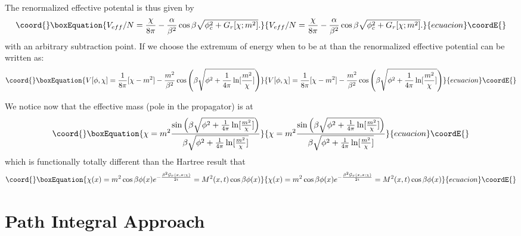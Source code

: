 \documentclass[a4paper,prd,preprint,superscriptaddress,showpacs,byrevtex]{revtex4}
\begin{document}
The renormalized effective potental is thus given by
\begin{equation}\coord{}\boxEquation{
V_{eff}/N  = \frac{\chi}{8 \pi} - \frac {\alpha} {\beta^2} \cos \beta
\sqrt{\phi_c^2 + G_r[\chi;m^2]}.
}{
V_{eff}/N  = \frac{\chi}{8 \pi} - \frac {\alpha} {\beta^2} \cos \beta
\sqrt{\phi_c^2 + G_r[\chi;m^2]}.
}{ecuacion}\coordE{}\end{equation}
with \coordHE{} an arbitrary subtraction point.
If we choose the extremum of energy when \coordHE{} to be at \coordHE{} than
the
renormalized effective potential can be written as:
\begin{equation}\coord{}\boxEquation{
V[\phi,\chi] = \frac{1}{8 \pi} [\chi -m^2] -\frac{m^2}{\beta^2} \cos \left(
\beta \sqrt{\phi^2+
\frac{1}{4 \pi} \ln[\frac{m^2}{\chi}]} \right)
}{
V[\phi,\chi] = \frac{1}{8 \pi} [\chi -m^2] -\frac{m^2}{\beta^2} \cos \left(
\beta \sqrt{\phi^2+
\frac{1}{4 \pi} \ln[\frac{m^2}{\chi}]} \right)
}{ecuacion}\coordE{}\end{equation}

We notice now that the effective mass (pole in the propagator) is  at
\begin{equation}\coord{}\boxEquation{
\chi=
m^2
\frac {\sin \left( \beta \sqrt{\phi^2+ \frac{1}{4 \pi}
\ln[\frac{m^2}{\chi}]} \right)}{\beta \sqrt{
\phi^2 +\frac{1}{4
\pi}
\ln[\frac{m^2}{\chi}]}}
}{
\chi=
m^2
\frac {\sin \left( \beta \sqrt{\phi^2+ \frac{1}{4 \pi}
\ln[\frac{m^2}{\chi}]} \right)}{\beta \sqrt{
\phi^2 +\frac{1}{4
\pi}
\ln[\frac{m^2}{\chi}]}}
}{ecuacion}\coordE{}\end{equation}
which is functionally totally different than the \coordHE{} Hartree result that
\begin{equation}\coord{}\boxEquation{
\chi(x) = m^2 \cos \beta \phi(x) e^{-\frac{\beta^2 {\cal G}_r(x,x;\chi)}{2i}} = M^2
(x,t) \cos \beta \phi(x) }{
\chi(x) = m^2 \cos \beta \phi(x) e^{-\frac{\beta^2 {\cal G}_r(x,x;\chi)}{2i}} = M^2
(x,t) \cos \beta \phi(x) }{ecuacion}\coordE{}\end{equation}

 \section{Path Integral Approach}
\end{document}
